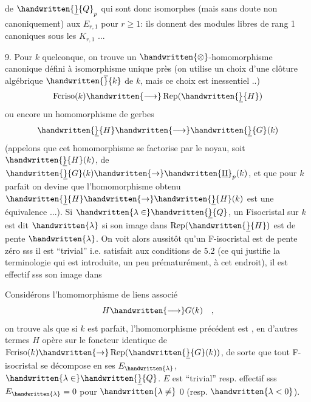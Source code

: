 de $\handwritten{\underline}{Q}_p$ \handwritten{)} qui sont donc isomorphes  (mais sans doute non canoniquement) aux $E_{r,1}$ pour $r\geq1$: ils donnent des modules libres de rang 1 canoniques sous les $K_{r,1}$ ...\handwritten{]}

9. Pour $k$ quelconque, on trouve un  $\handwritten{\otimes}$-homomorphisme canonique  défini à isomorphisme unique près (on utilise un choix d'une clôture algébrique $\handwritten{\overline}{k}$ de $k$, mais ce choix est inessentiel ..)
\[
\operatorname{Fcriso}(k)\handwritten{\longrightarrow}\operatorname{Rep}(\handwritten{\underline}{H})
\]
ou encore un homomorphisme de gerbes
\[
\handwritten{\underline}{H}\handwritten{\longrightarrow}\handwritten{\underline}{G}(k)
\]
(appelons que cet homomorphisme se factorise par le noyau, soit  $\handwritten{\underline}{H}(k)$, de $\handwritten{\underline}{G}(k)\handwritten{\to}\handwritten{\underline{\Pi}}_p(k)$, et que pour $k$ parfait on devine que l'homomorphisme obtenu $\handwritten{\underline}{H}\handwritten{\to}\handwritten{\underline}{H}(k)$ est une équivalence ...). Si $\handwritten{\lambda\in}\handwritten{\underline}{Q}$, un F\deleted{(}\handwritten{-}isocristal sur $k$ est dit   $\handwritten{\lambda}$ si son image dans $\operatorname{Rep}(\handwritten{\underline}{H})$ est de pente $\handwritten{\lambda}$. On voit alors aussitôt qu'un F-isocristal est de pente zéro sss il est ``trivial'' i.e. satisfait aux conditions de 5.2 (ce qui justifie la terminologie qui est introduite, un peu prématurément, à cet endroit), il est effectif sss son image dans 

Considérons l'homomorphisme de liens associé
\[
H\handwritten{\longrightarrow}G(k)\quad ,
\]
on trouve als que si $k$ est parfait, l'homomorphisme précédent est , en d'autres termes $H$ opère sur le foncteur identique de $\operatorname{Fcriso}(k)\handwritten{\to}\operatorname{Rep}(\handwritten{\underline}{G}(k))$, de sorte que tout F-isocristal  se décompose en ses  $E_{\handwritten{\lambda}}$, $\handwritten{\lambda\in}\handwritten{\underline}{Q}$. $E$ est ``trivial'' resp. effectif sss $E_{\handwritten{\lambda}}=0$ pour $\handwritten{\lambda\ne}$ 0 (resp. $\handwritten{\lambda<0}$).

